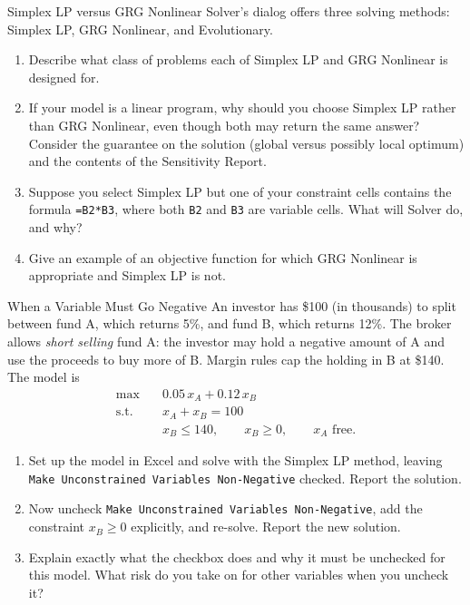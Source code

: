 \begin{ex}{Simplex LP versus GRG Nonlinear}{}
\label{ex:excel-solver-methods}
 Solver's dialog offers three solving methods: Simplex LP, GRG Nonlinear, and Evolutionary.
\begin{enumerate}
\item Describe what class of problems each of Simplex LP and GRG Nonlinear is designed for.
\item If your model is a linear program, why should you choose Simplex LP rather than GRG Nonlinear, even though both may return the same answer?  Consider the guarantee on the solution (global versus possibly local optimum) and the contents of the Sensitivity Report.
\item Suppose you select Simplex LP but one of your constraint cells contains the formula \texttt{=B2*B3}, where both \texttt{B2} and \texttt{B3} are variable cells.  What will Solver do, and why?
\item Give an example of an objective function for which GRG Nonlinear is appropriate and Simplex LP is not.
\end{enumerate}
\exrefs{\S\ref{sec:excel-solver}}
\end{ex}


\begin{ex}{When a Variable Must Go Negative}{}
\label{ex:excel-short-selling}
 An investor has \$100 (in thousands) to split between fund A, which returns 5\%, and fund B, which returns 12\%.  The broker allows \emph{short selling} fund A: the investor may hold a negative amount of A and use the proceeds to buy more of B.  Margin rules cap the holding in B at \$140.  The model is
\begin{align*}
\max \quad & 0.05\,x_A + 0.12\,x_B\\
\text{s.t.} \quad & x_A + x_B = 100\\
& x_B \leq 140, \qquad x_B \geq 0, \qquad x_A \text{ free}.
\end{align*}
\begin{enumerate}
\item Set up the model in Excel and solve with the Simplex LP method, leaving \texttt{Make Unconstrained Variables Non-Negative} checked.  Report the solution.
\item Now uncheck \texttt{Make Unconstrained Variables Non-Negative}, add the constraint $x_B \geq 0$ explicitly, and re-solve.  Report the new solution.
\item Explain exactly what the checkbox does and why it must be unchecked for this model.  What risk do you take on for other variables when you uncheck it?
\end{enumerate}
\exrefs{\S\ref{sec:excel-solver}}
\end{ex}

